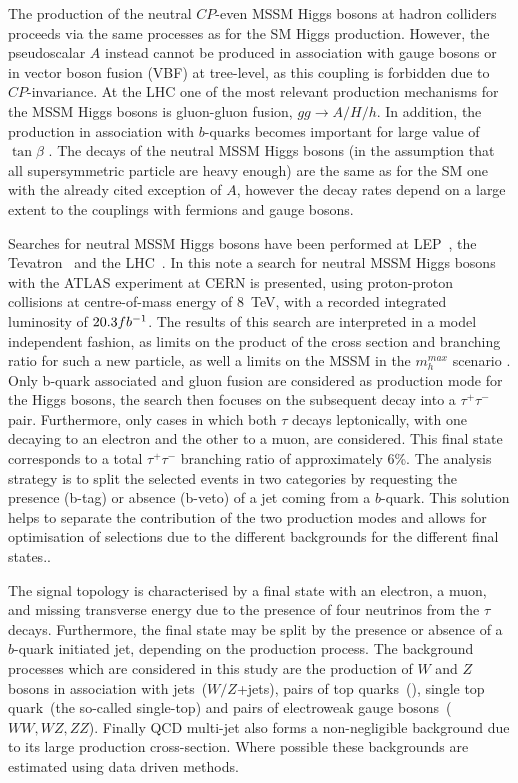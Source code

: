 The production of the neutral $CP$-even MSSM Higgs bosons at hadron
colliders proceeds via the same processes as for the SM Higgs
production. However, the pseudoscalar $A$ instead cannot be produced
in association with gauge bosons or in vector boson fusion (VBF) at
tree-level, as this coupling is forbidden due to $CP$-invariance.  At
the LHC one of the most relevant production mechanisms for the MSSM
Higgs bosons is gluon-gluon fusion, $gg\rightarrow A/H/h$. In
addition, the production in association with $b$-quarks becomes
important for large value of $\tan\beta$ .  The decays of the neutral
MSSM Higgs bosons (in the assumption that all supersymmetric particle
are heavy enough) are the same as for the SM one with the already
cited exception of $A$, however the decay rates depend on a large
extent to the couplings with fermions and gauge bosons.

Searches for neutral MSSM Higgs bosons have been performed at
LEP~\cite{LEPLimits}, the
Tevatron~\cite{TevatronLimits1,TevatronLimits2,TevatronLimits3,TevatronLimits4,TevatronLimits5,TevatronLimits6}
and the LHC~\cite{CMSLimit, ATLASLimit}.  In this note a search for
neutral MSSM Higgs bosons with the ATLAS experiment at CERN is
presented, using proton-proton collisions at centre-of-mass energy of
8~TeV, with a recorded integrated luminosity of
$20.3 fb^{-1}$.
The results of this search are interpreted in a model independent
fashion, as limits on the product of the cross section and branching
ratio for such a new particle, as well a limits on the MSSM in the
$m_{h}^{max}$ scenario \cite{MSSMmhmax}. Only b-quark associated and
gluon fusion are considered as production mode for the Higgs bosons, the search then focuses
on the subsequent decay into a
$\tau^+\tau^-$ pair. Furthermore, only cases in which both $\tau$
decays leptonically, with one decaying to an electron and the other to
a muon, are considered. This final state corresponds to a total
$\tau^+\tau^-$ branching ratio of approximately 6\%.
The analysis strategy is to
split the selected events in two categories by requesting the presence
(b-tag) or absence (b-veto) of a jet coming from a $b$-quark. This
solution helps to separate the contribution of the two production modes
and allows for optimisation of selections due to the 
different backgrounds for the different final states..

The signal topology is characterised by a final state with an
electron, a muon, and missing transverse energy due to the
presence of four neutrinos from the $\tau$ decays. Furthermore, the
final state may be split by the presence or
absence of a $b$-quark initiated jet, depending on the production
process.  The background processes which are considered in this study
are the production of $W$ and $Z$ bosons in association with
jets~($W/Z$+jets), pairs of top quarks~(\ttbar), single top
quark~(the so-called single-top) and pairs of electroweak gauge
bosons~($WW, WZ, ZZ$). Finally QCD multi-jet also forms a non-negligible
background due to its large production cross-section. Where possible
these backgrounds are estimated using data driven methods.

